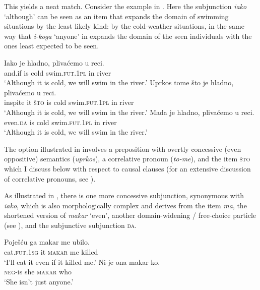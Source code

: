 \documentclass[output=paper]{langscibook}
\begin{document}
This yields a neat match. Consider the example in . Here the subjunction \textit{iako} `although' can be seen as an item that expands the domain of swimming situations by the least likely kind: by the cold-weather situations, in the same way that \textit{i-koga} `anyone' in  expands the domain of the seen individuals with the ones least expected to be seen.

\ea\label{ex:Conc-clauses}
    \ea \gll Iako je hladno, plivaćemo u reci.\\
    and.if is cold swim.\textsc{fut.1pl} in river\\
    \glt `Although it is cold, we will swim in the river.'\label{ex:Conc-clauses-a}
	\ex \gll Uprkos tome što je hladno, plivaćemo u reci.\\
    inspite it \textsc{što} is cold swim.\textsc{fut.1pl} in river\\
    \glt `Although it is cold, we will swim in the river.'\label{ex:Conc-clauses-b}
	\ex \gll Mada je hladno, plivaćemo u reci.\\
    even.\textsc{da} is cold swim.\textsc{fut.1pl} in river\\
\glt `Although it is cold, we will swim in the river.'\label{ex:Conc-clauses-c}
\z\z

\noindent The option illustrated in  involves a preposition with overtly concessive (even oppositive) semantics (\textit{uprkos}), a correlative pronoun (\textit{to-me}), and the item \textsc{što} which I discuss below with respect to causal clauses (for an extensive discussion of correlative pronouns, see ).

As illustrated in , there is one more concessive subjunction, synonymous with \textit{iako}, which is also morphologically complex and derives from the item \textit{ma}, the shortened version of \textit{makar} `even', another domain-widening / free-choice particle (see ), and the subjunctive subjunction \textsc{da}.

\ea\label{ex:Makar}
    \ea \gll Poješću ga makar me ubilo.\\
    eat.\textsc{fut.1sg} it \textsc{makar} me killed\\
    \glt `I'll eat it even if it killed me.'\label{ex:Makar-a}
	\ex \gll Ni-je ona makar ko.\\
    \textsc{neg}-is she \textsc{makar} who\\
    \glt `She isn't just anyone.'\label{ex:Makar-b}
\z\z
\end{document}
